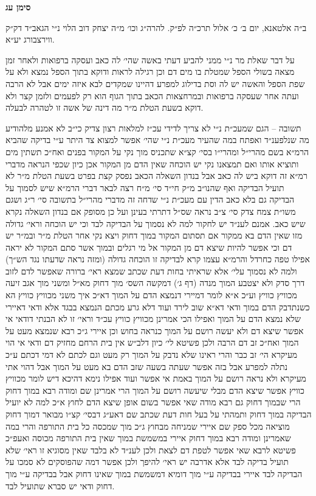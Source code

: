 \documentclass[12pt, openany]{book}
\newcommand{\chapname}{}
\newcommand{\newchap}[1]{
	\addcontentsline{toc}{chapter}{#1}
	\renewcommand{\chapname}{#1}
		\begin{center}
			\textbf{%
\fontsize{16pt}{16pt}\selectfont
				#1}
		\end{center}
}
\begin{document}
\newchap{סימן עג}
\begin{multicols}{2}
ב״ה אלטאנא, יום ב׳ כ׳ אלול תרכ״ה לפ״ק. להרה״ג וכו׳ מ״ה יצחק דוב הלוי נ״י הגאב״ד דק״ק ווירצבורג יע״א.\\\vspace{0pt}

על דבר שאלת מר נ״י ממני להביע דעתי באשה שהי׳ לה כאב ועסקה ברפואות ולאחר זמן מצאה בשולי הספל שמטלת בו מים דם וכן רגילה לראות ודוקא בתוך הספל נמצא ולא על שפת הספל והאשה יש לה וסת בדילוג למפרע דהיינו שמקדים לבא איזה ימים אבל לא הרבה ועתה אחר שעסקה ברפואות ובמרחצאות הכאב בתוך הגוף הוא רק לפעמים ולזמן קצר ולא דוקא בשעת הטלת מ״ר מה דינה של אשה זו לטהרה לבעלה.\\\vspace{0pt}

תשובה – הגם שמעכ״ת נ״י לא צריך לדידי עכ״ז למלאות רצון צדיק כי״ב לא אמנע מלהודיע מה שנלפענ״ד ואפתח במה שהעיר מעכ״ת נ״י שהי׳ אפשר למצוא צד היתר ע״י בדיקה שהביא הרמ״א בשם מהרי״ל ומהרי״ו בסי׳ קצ״א שתכניס מוך נקי על המקור בפנים ואח״כ תשתין מים ותוציא אותו ואם תמצאנו נקי יש הוכחה שאין הדם מן המקור אכן כיון שכפי הנראה מדברי רמ״א זה דוקא ביש לה כאב אבל בנדון השאלה הכאב נפסק קצת בפרט בשעת הטלת מ״ר לא תועיל הבדיקה ואף שהנו״ב מ״ק חי״ד סי׳ מ״ח רצה לבאר דברי הרמ״א שיש לסמוך על הבדיקה גם בלא כאב הדין עם מעכ״ת נ״י שדחה זה מדברי מהרי״ל בתשובה סי׳ ר״ג ושגם משו״ת צמח צדק סי׳ צ״ב נראה שס״ל דתרתי בעינן ועל כן מסופק אם בנדון השאלה נקרא שיש כאב. אמנם לענ״ד יש לחקור למה לא נסמוך על הבדיקה לבד וכי יש הוכחה וראי׳ גדולה מזו שאין הדם בא ממקור אם תסתום המקור במוך דחוק ויצא נקי אחר הטלת מ״ר ובמ״ר יש דם וכי אפשר להיות שיצא דם מן המקור אל מי רגלים ובמוך אשר סתם המקור לא יראה אפילו טפה כחרדל והרמ״א עצמו קרא לבדיקה זו הוכחה גדולה (ומזה נראה שדעתו נגד הש״ך) ולמה לא נסמוך עלי׳ אלא שראיתי בחות דעת שכתב שמצא ראי׳ ברורה שאפשר לדם לזוב דרך סדק ולא יצטבע המוך מנדה (דף ג׳) דמקשה השס׳ מוך דחוק מא״ל ומשני מוך אגב זיעה מכוויץ כוויץ וע״כ א״א לומר דמיירי דנמצא הדם על המוך דא״כ איך משני מכוויץ כוויץ הא כשנתדבק הדם במוך ודאי דא״א שוב לירד ועוד דלא גרע מכתם הנמצא בבגד אלא ודאי דאיירי שלא נמצא הדם על המוך ואפילו הכי אמרינן מכוויץ כוויץ עכ״ד וראי׳ זו לא הבנתי דודאי אי אפשר שיצא דם ולא יעשה רושם על המוך כנראה בחוש וכן איירי ג״כ רבא שנמצא מעט על המוך ואח״כ זב דם הרבה ולכן פשיטא לי׳ כיון דלב״ש אין בית הרחם מחזיק דם ודאי אי הוי מעיקרא הי׳ זב כבר והרי ראינו שלא נדבק על המוך רק מעט וגם לכתם לא דמי דכתם ע״כ נתלה למפרע אבל בזה אפשר שעתה בשעה שזב הדם בא מעט על המוך אבל דהוי אתי מעיקרא ולא נראה רושם על המוך באמת אי אפשר ועוד אפילו נימא דהיכא דיש לומר מכוויץ כוויץ אפשר שיצא הדם מבלי שיעשה רושם על המוך הרי אמרינן שם ומודה רבא במוך דחוק הרי שבמוך דחוק גם רבא מודה שאי אפשר בשום אופן שיצא הדם לחוץ א״כ למה לא יועיל הבדיקה במוך דחוק ותמהתי על בעל חות דעת שכתב שם דאע״ג דבסי׳ קצ״ו מבואר דמוך דחוק מוציאה מכל ספק שם איירי שמניחה מבחוץ ג״כ מוך שמכסה כל בית התורפה והרי במה שאמרינן ומודה רבא במוך דחוק איירי במשמשת במוך שאין בית התורפה מכוסה ואעפ״כ פשיטא לרבא שאי אפשר לטפת דם לצאת ולכן לענ״ד לא בלבד שאין מסוגיא זו ראי׳ שלא תועיל בדיקה לבד אלא אדרבה יש ראי׳ להיפך ולכן אפשר דמה שהפוסקים לא סמכו על הבדיקה לבד איירי בבדיקה ע״י מוך דומיא דמשמשת במוך שאינו דחוק אבל בבדיקה ע״י מוך דחוק ודאי יש סברא שתועיל לבד.\\\vspace{0pt}


\end{multicols}
\end{document}
